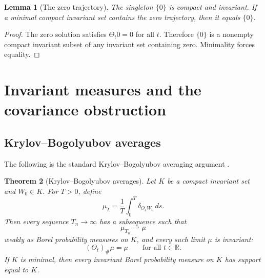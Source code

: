 \documentclass[11pt]{amsart}
\theoremstyle{plain}
\newtheorem{theorem}{Theorem}[section]
\newtheorem{lemma}[theorem]{Lemma}
\theoremstyle{definition}
\theoremstyle{remark}
\numberwithin{equation}{section}
\newcommand{\R}{\mathbb R}
\begin{document}
\begin{lemma}[The zero trajectory]\label{lem:zero-trajectory}
The singleton \(\{0\}\) is compact and invariant.  If a minimal compact
invariant set contains the zero trajectory, then it equals \(\{0\}\).
\end{lemma}

\begin{proof}
The zero solution satisfies \(\Theta_t0=0\) for all \(t\).  Therefore
\(\{0\}\) is a nonempty compact invariant subset of any invariant set
containing zero.  Minimality forces equality.
\end{proof}

\section{Invariant measures and the covariance obstruction}
\label{sec:measures-covariance}

\subsection{Krylov--Bogolyubov averages}

The following is the standard Krylov--Bogolyubov averaging argument
\cite{KryloffBogoliouboff1937,Billingsley1999}.

\begin{theorem}[Krylov--Bogolyubov averages]\label{thm:KB}
Let \(K\) be a compact invariant set and \(W_0\in K\).  For \(T>0\), define
\[
   \mu_T
   =
   \frac1T\int_0^T\delta_{\Theta_sW_0}\,ds .
\]
Then every sequence \(T_n\to\infty\) has a subsequence such that
\[
   \mu_{T_n}\rightharpoonup\mu
\]
weakly as Borel probability measures on \(K\), and every such limit \(\mu\)
is invariant:
\[
   (\Theta_t)_\#\mu=\mu
   \qquad\text{for all }t\in\R .
\]
If \(K\) is minimal, then every invariant Borel probability measure on \(K\)
has support equal to \(K\).
\end{theorem}
\end{document}

